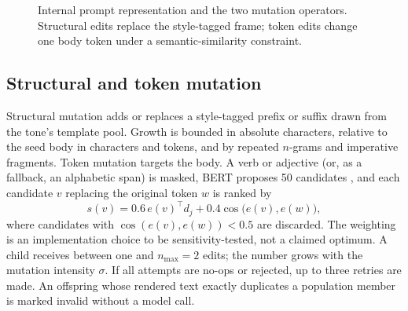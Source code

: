 \documentclass[preprint,12pt,authoryear]{elsarticle}
\begin{document}
\begin{figure}[t]
\centering
{}
\caption{Internal prompt representation and the two mutation operators. Structural edits replace the style-tagged frame; token edits change one body token under a semantic-similarity constraint.}
\label{fig:mutation}
\end{figure}

\subsection{Structural and token mutation}
Structural mutation adds or replaces a style-tagged prefix or suffix drawn from the tone's template pool. Growth is bounded in absolute characters, relative to the seed body in characters and tokens, and by repeated $n$-grams and imperative fragments. Token mutation targets the body. A verb or adjective (or, as a fallback, an alphabetic span) is masked, BERT proposes 50 candidates \citep{devlin2019bert}, and each candidate $v$ replacing the original token $w$ is ranked by
\begin{equation}
s(v)=0.6\,e(v)^{\top}d_j+0.4\cos\big(e(v),e(w)\big),
\end{equation}
where candidates with $\cos(e(v),e(w))<0.5$ are discarded. The weighting is an implementation choice to be sensitivity-tested, not a claimed optimum. A child receives between one and $n_{\max}=2$ edits; the number grows with the mutation intensity $\sigma$. If all attempts are no-ops or rejected, up to three retries are made. An offspring whose rendered text exactly duplicates a population member is marked invalid without a model call.
\end{document}
